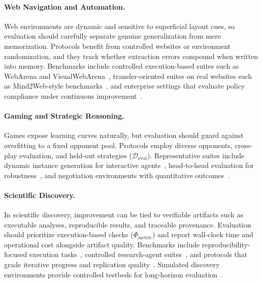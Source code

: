 \documentclass{article}
\begin{document}
\paragraph{Web Navigation and Automation.}
Web environments are dynamic and sensitive to superficial layout cues, so evaluation should carefully separate genuine generalization from mere memorization. Protocols benefit from controlled websites or environment randomization, and they  track whether extraction errors compound when written into memory. Benchmarks include controlled execution-based suites such as WebArena and VisualWebArena~\citep{zhou2024webarena, koh2024visualwebarenaevaluatingmultimodalagents}, transfer-oriented suites on real websites such as Mind2Web-style benchmarks~\citep{deng2023mindweb, pan2024webcanvas}, and enterprise settings that evaluate policy compliance under continuous improvement~\citep{levy2025stwebagentbenchbenchmarkevaluatingsafety}.

\paragraph{Gaming and Strategic Reasoning.}
Games expose learning curves naturally, but evaluation should guard against overfitting to a fixed opponent pool. Protocols employ diverse opponents, cross-play evaluation, and held-out strategies ($\mathcal{D}_{\text{eval}}$). Representative suites include dynamic instance generation for interactive agents~\citep{chalamalasetti-etal-2023-clembench, beyer2024clembench2024challengingdynamiccomplementary}, head-to-head evaluation for robustness~\citep{costarelli2024gamebench}, and negotiation environments with quantitative outcomes~\citep{abdelnabi2024llmdeliberation, duan2024gtbenchuncoveringstrategicreasoning}.

\paragraph{Scientific Discovery.}
In scientific discovery, improvement can be tied to verifiable artifacts such as executable analyses, reproducible results, and traceable provenance. Evaluation should prioritize execution-based checks ($\Phi_{\text{metric}}$) and  report wall-clock time and operational cost alongside artifact quality. Benchmarks include reproducibility-focused execution tasks~\citep{siegel2024corebenchfosteringcredibilitypublished}, controlled research-agent suites~\citep{bragg2025astabenchrigorousbenchmarkingai}, and protocols that grade iterative progress and replication quality~\citep{starace2025paperbenchevaluatingaisability}. Simulated discovery environments provide controlled testbeds for long-horizon evaluation~\citep{jansen2024discoveryworldvirtualenvironmentdeveloping, chen2025physgym}.
\end{document}
